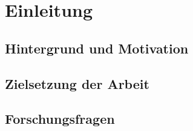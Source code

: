 \chapter{Einleitung}


\section{Hintergrund und Motivation}

\section{Zielsetzung der Arbeit}

\section{Forschungsfragen}